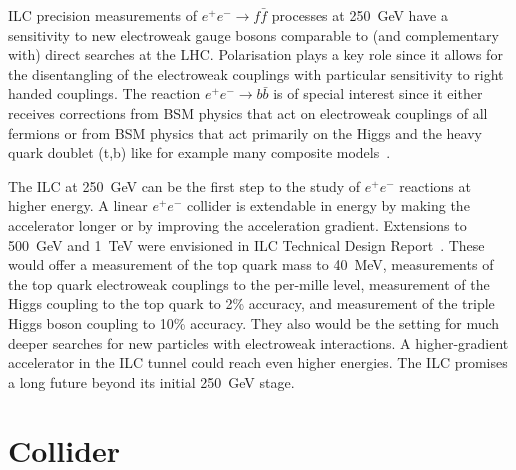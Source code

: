 \documentclass[%
 reprint,
 amsmath,amssymb,
 aps,
]{revtex4-1}
\newcommand{\todo}[1]{\textcolor{red}{{#1}}}
\def\ee{e^+e^-}
\begin{document}
ILC precision measurements of $\ee\to f\bar f$ processes at 250~GeV have a sensitivity to new
electroweak gauge bosons comparable to (and complementary with) 
direct searches at the LHC.  Polarisation plays a key role since it allows for the disentangling of the electroweak couplings with particular sensitivity to right handed couplings. The reaction $\ee\to b\bar b$ 
is of special interest since it either receives corrections from BSM physics that act on electroweak couplings of all fermions or from BSM physics that act primarily on the Higgs and the heavy quark doublet (t,b) like for example many composite models~\cite{eetobb1,eetobb2}. 

The ILC at 250~GeV can be the first step to the study of $\ee$
reactions at higher energy.   A linear $\ee$ collider is extendable in
energy by making the accelerator longer or by improving the
acceleration gradient. Extensions to 500~GeV and 1~TeV were envisioned
in ILC Technical Design Report~\cite{Behnke:2013xla}.    These would offer a
measurement of the top quark mass to 40~MeV, measurements of the top
quark electroweak couplings to the per-mille level, measurement of the
Higgs coupling to the top quark to 2\% accuracy, and measurement of
the triple Higgs boson coupling to 10\%  accuracy. They  also would be
the setting for much 
deeper searches for new particles with electroweak interactions.
A higher-gradient accelerator in the ILC tunnel could reach even
higher energies.  The
ILC promises a long future beyond its initial 250~GeV stage.





\section{\label{sec:collider}Collider}

\end{document}
